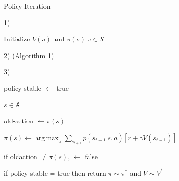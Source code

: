 \documentclass{beamer}
\DeclareMathOperator*{\argmax}{arg\,max}
\begin{document}
\begin{frame}{Policy Iteration}

\begin{algorithm}[H]
\caption{Policy Iteration for estimating $\pi \sim \pi^{*}$}

\vspace{1mm}

1) \textbf{}

Initialize $V(s)$ and $\pi(s)$  $s \in \mathcal{S}$
\vspace{3mm}


2) \textbf{} (Algorithm 1)
\vspace{3mm}

3) \textbf{}

\vspace{0.5mm}

\hspace{6mm}policy-stable $\leftarrow$ true 

\vspace{0.5mm}

 \hspace{5mm} \textbf{}  $s \in \mathcal{S}$ \textbf{} 
 
 \vspace{0.4mm}
 
 \hspace{11mm} old-action $\leftarrow \pi(s)$
 
 \vspace{0.5mm}
 
 \hspace{11mm} $\pi(s) \leftarrow \argmax_a \sum_{s_{t+1}} p(s_{t+1}|s,a) [r + \gamma V(s_{t+1})]$
 
 \vspace{0.5mm}
 
 \hspace{11mm} if old\text{-}action $\neq \pi(s)$,  $\leftarrow$ false
 
 \vspace{0.5mm}
 
 \hspace{6mm}if policy-stable = true then return $\pi \sim \pi^{*}$ and $V \sim V^{*}$
 

\vspace{1mm}
\end{algorithm}

\end{frame}
\end{document}
